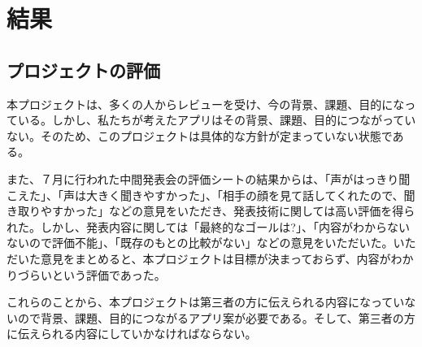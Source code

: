 \documentclass[openany,11pt,papersize]{jsbook}
\begin{document}

\chapter{結果}
\section{プロジェクトの評価}
本プロジェクトは、多くの人からレビューを受け、今の背景、課題、目的になっている。しかし、私たちが考えたアプリはその背景、課題、目的につながっていない。そのため、このプロジェクトは具体的な方針が定まっていない状態である。

また、７月に行われた中間発表会の評価シートの結果からは、「声がはっきり聞こえた」、「声は大きく聞きやすかった」、「相手の顔を見て話してくれたので、聞き取りやすかった」などの意見をいただき、発表技術に関しては高い評価を得られた。しかし、発表内容に関しては「最終的なゴールは?」、「内容がわからないないので評価不能」、「既存のもとの比較がない」などの意見をいただいた。いただいた意見をまとめると、本プロジェクトは目標が決まっておらず、内容がわかりづらいという評価であった。

これらのことから、本プロジェクトは第三者の方に伝えられる内容になっていないので背景、課題、目的につながるアプリ案が必要である。そして、第三者の方に伝えられる内容にしていかなければならない。
\end{document}
